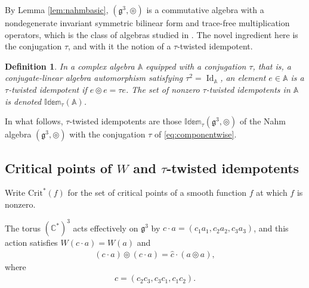 \documentclass [leqno, 10pt]{amsart}
\newtheorem{definition}[theorem]{Definition}%
\theoremstyle{definition}
\numberwithin{equation}{section}
\newcommand{\idem}{\mathbb{Idem}}
\newcommand{\tmlt}{\circledcirc}
\newcommand{\alg}{\mathbb{A}}
\newcommand{\id}{\operatorname{Id}}
\newcommand{\g}{\mathfrak{g}}
\newcommand{\com}{\mathbb C}
\newcommand{\crtnt}{\mathrm{Crit}^*}
\begin{document}
By Lemma \ref{lem:nahmbasic}, $(\g^{3}, \tmlt)$ is a commutative algebra with a nondegenerate invariant symmetric bilinear form and trace-free multiplication operators, which is the class of algebras studied in \cite{Fox-cubicpoly, Fox-trace}. The novel ingredient here is the conjugation $\tau$, and with it the notion of a $\tau$-twisted idempotent.

\begin{definition}\label{def:twisted}
In a complex algebra $\alg$ equipped with a conjugation $\tau$, that is, a conjugate-linear algebra automorphism satisfying $\tau^{2} = \id_{\alg}$, an element $e \in \alg$ is a \emph{$\tau$-twisted idempotent} if $e \tmlt e = \tau e$. The set of nonzero $\tau$-twisted idempotents in $\alg$ is denoted $\idem_{\tau}(\alg)$.
\end{definition}
In what follows, $\tau$-twisted idempotents are those $\idem_{\tau}(\g^{3}, \tmlt)$ of the Nahm algebra $(\g^{3}, \tmlt)$ with the conjugation $\tau$ of \eqref{eq:componentwise}.

\subsection{Critical points of $W$ and $\tau$-twisted idempotents}
Write $\crtnt(f)$ for the set of critical points of a smooth function $f$ at which $f$ is nonzero. 

The torus $(\com^{\ast})^{3}$ acts effectively on $\g^{3}$ by $c \cdot a = (c_{1}a_{1}, c_{2}a_{2}, c_{3}a_{3})$, and this action satisfies $W(c \cdot a) = W(a)$ and
\begin{align}\label{caca}
(c\cdot a) \tmlt (c\cdot a) = \hat{c}\cdot (a\tmlt a),
\end{align}
where 
\begin{align}\label{hatc}
\hat{c} = (c_{2}c_{3}, c_{3}c_{1}, c_{1}c_{2}).
\end{align}
\end{document}
